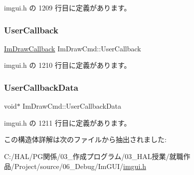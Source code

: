  imgui.\+h の 1209 行目に定義があります。

\mbox{\label{struct_im_draw_cmd_ad26dac4e939f5c4bb892cbca0f9e3af8}} 
\subsubsection{\texorpdfstring{User\+Callback}{UserCallback}}
{\footnotesize\ttfamily \mbox{\hyperlink{imgui_8h_a232a477233f9e3ab7640720bf94674de}{Im\+Draw\+Callback}} Im\+Draw\+Cmd\+::\+User\+Callback}



 imgui.\+h の 1210 行目に定義があります。

\mbox{\label{struct_im_draw_cmd_ae2f5a0baf4a0b25942237b8ce6adb42d}} 
\subsubsection{\texorpdfstring{User\+Callback\+Data}{UserCallbackData}}
{\footnotesize\ttfamily void$\ast$ Im\+Draw\+Cmd\+::\+User\+Callback\+Data}



 imgui.\+h の 1211 行目に定義があります。



この構造体詳解は次のファイルから抽出されました\+:\begin{DoxyCompactItemize}
\item 
C\+:/\+H\+A\+L/\+P\+G関係/03\+\_\+作成プログラム/03\+\_\+\+H\+A\+L授業/就職作品/\+Project/source/06\+\_\+\+Debug/\+Im\+G\+U\+I/\mbox{\hyperlink{imgui_8h}{imgui.\+h}}\end{DoxyCompactItemize}
